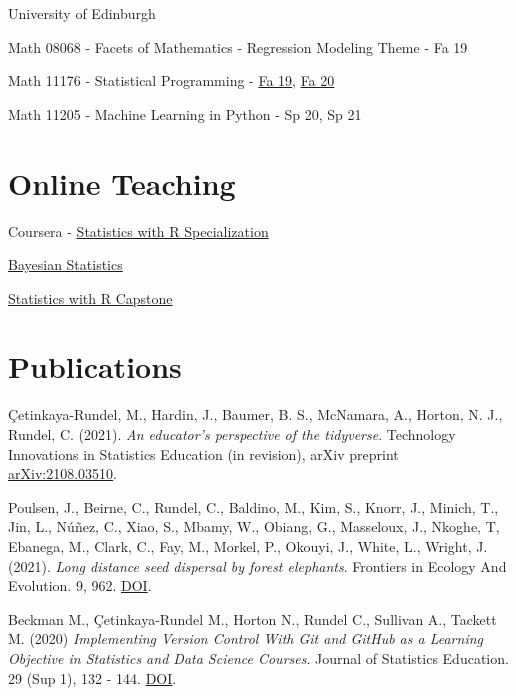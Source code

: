 \documentclass[margin,line]{res}
\begin{document}
\begin{resume}
University of Edinburgh

\begin{list1}
\item[] Math 08068 - Facets of Mathematics - Regression Modeling Theme - Fa 19 

\item[] Math 11176 - Statistical Programming - \href{https://statprog-s1-2019.github.io/}{Fa 19}, \href{https://statprog-s1-2020.github.io/}{Fa 20}

\item[] Math 11205 - Machine Learning in Python - Sp 20, Sp 21
\end{list1}

\pagebreak


\section{\sc Online Teaching}

Coursera - \href{https://www.coursera.org/specializations/statistics}{Statistics with R Specialization}
\begin{list1}
\item[] \href{https://www.coursera.org/learn/bayesian}{Bayesian Statistics}
\item[] \href{https://www.coursera.org/learn/statistics-project}{Statistics with R Capstone}
\end{list1}

\section{\sc Publications}

Çetinkaya-Rundel, M., Hardin, J., Baumer, B. S., McNamara, A., Horton, N. J., Rundel, C. (2021). {\em An educator's perspective of the tidyverse}. Technology Innovations in Statistics Education (in revision), arXiv preprint \href{https://arxiv.org/abs/2108.03510}{arXiv:2108.03510}.

\vspace{-0.15cm}
Poulsen, J., Beirne, C., Rundel, C., Baldino, M., Kim, S., Knorr, J., Minich, T., Jin, L.,  Núñez, C., Xiao, S., Mbamy, W., Obiang, G., Masseloux, J., Nkoghe, T, Ebanega, M., Clark, C., Fay, M., Morkel, P., Okouyi, J., White, L., Wright, J. (2021). {\em Long distance seed dispersal by forest elephants}. Frontiers in Ecology And Evolution. 9, 962. \href{https://doi.org/10.3389/fevo.2021.789264}{DOI}.

\vspace{-0.15cm}
Beckman M., Çetinkaya-Rundel M., Horton N., Rundel C., Sullivan A., Tackett M. (2020) {\em Implementing Version Control With Git and GitHub as a Learning Objective in Statistics and Data Science Courses}. Journal of Statistics Education. 29 (Sup 1), 132 - 144. \href{https://doi.org/10.1080/10691898.2020.1848485}{DOI}.


\end{resume}
\end{document}
